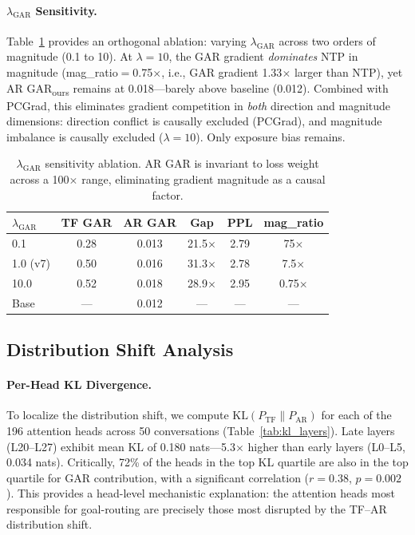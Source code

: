 \documentclass[11pt]{article}
\newcommand{\gar}{\textsc{GAR}}
\newcommand{\garours}{\textsc{GAR}\textsubscript{ours}}
\begin{document}
\paragraph{$\lambda_{\text{GAR}}$ Sensitivity.} Table~\ref{tab:lambda} provides an orthogonal ablation: varying $\lambda_{\text{GAR}}$ across two orders of magnitude (0.1 to 10). At $\lambda=10$, the \gar{} gradient \emph{dominates} NTP in magnitude (mag\_ratio$=$0.75$\times$, i.e., GAR gradient 1.33$\times$ larger than NTP), yet AR \garours{} remains at 0.018---barely above baseline (0.012). Combined with PCGrad, this eliminates gradient competition in \emph{both} direction and magnitude dimensions: direction conflict is causally excluded (PCGrad), and magnitude imbalance is causally excluded ($\lambda=10$). Only exposure bias remains.

\begin{table}[t]
\centering
\small
\caption{$\lambda_{\text{GAR}}$ sensitivity ablation. AR \gar{} is invariant to loss weight across a 100$\times$ range, eliminating gradient magnitude as a causal factor.}
\label{tab:lambda}
\begin{tabular}{lccccc}
\toprule
$\lambda_{\text{GAR}}$ & \textbf{TF \gar{}} & \textbf{AR \gar{}} & \textbf{Gap} & \textbf{PPL} & \textbf{mag\_ratio} \\
\midrule
0.1 & 0.28 & 0.013 & 21.5$\times$ & 2.79 & 75$\times$ \\
1.0 (v7) & 0.50 & 0.016 & 31.3$\times$ & 2.78 & 7.5$\times$ \\
10.0 & 0.52 & 0.018 & 28.9$\times$ & 2.95 & 0.75$\times$ \\
Base & --- & 0.012 & --- & --- & --- \\
\bottomrule
\end{tabular}
\end{table}

\subsection{Distribution Shift Analysis}

\paragraph{Per-Head KL Divergence.} To localize the distribution shift, we compute $\text{KL}(P_{\text{TF}} \| P_{\text{AR}})$ for each of the 196 attention heads across 50 conversations (Table~\ref{tab:kl_layers}). Late layers (L20--L27) exhibit mean KL of 0.180 nats---5.3$\times$ higher than early layers (L0--L5, 0.034 nats). Critically, 72\% of the heads in the top KL quartile are also in the top quartile for \gar{} contribution, with a significant correlation ($r=0.38$, $p=0.002$). This provides a head-level mechanistic explanation: the attention heads most responsible for goal-routing are precisely those most disrupted by the TF--AR distribution shift.
\end{document}
